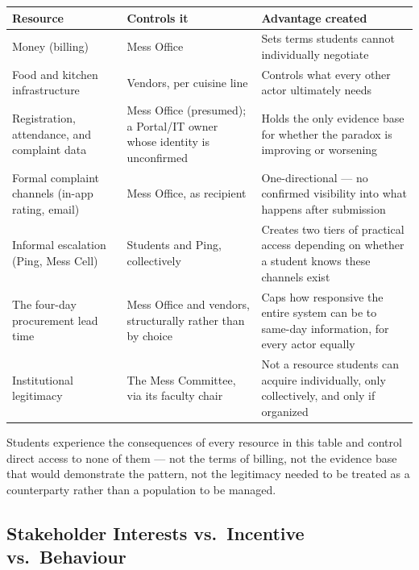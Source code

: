 \documentclass[11pt]{article}
\begin{document}
{\small\setlength{\tabcolsep}{4pt}
\begin{longtable}{L{0.24\textwidth}L{0.26\textwidth}L{0.4\textwidth}}
\toprule
\textbf{Resource} & \textbf{Controls it} & \textbf{Advantage created} \\
\midrule
\endhead
Money (billing) & Mess Office & Sets terms students cannot individually negotiate \\[4pt]
Food and kitchen infrastructure & Vendors, per cuisine line & Controls what every
other actor ultimately needs \\[4pt]
Registration, attendance, and complaint data & Mess Office (presumed); a Portal/IT
owner whose identity is unconfirmed & Holds the only evidence base for whether the
paradox is improving or worsening \\[4pt]
Formal complaint channels (in-app rating, email) & Mess Office, as recipient &
One-directional --- no confirmed visibility into what happens after submission \\[4pt]
Informal escalation (Ping, Mess Cell) & Students and Ping, collectively & Creates two
tiers of practical access depending on whether a student knows these channels exist \\[4pt]
The four-day procurement lead time & Mess Office and vendors, structurally rather
than by choice & Caps how responsive the entire system can be to same-day
information, for every actor equally \\[4pt]
Institutional legitimacy & The Mess Committee, via its faculty chair & Not a
resource students can acquire individually, only collectively, and only if organized \\
\bottomrule
\end{longtable}}

Students experience the consequences of every resource in this table and control
direct access to none of them --- not the terms of billing, not the evidence base
that would demonstrate the pattern, not the legitimacy needed to be treated as a
counterparty rather than a population to be managed.

\subsection{Stakeholder Interests vs.\ Incentive vs.\ Behaviour}
\end{document}
